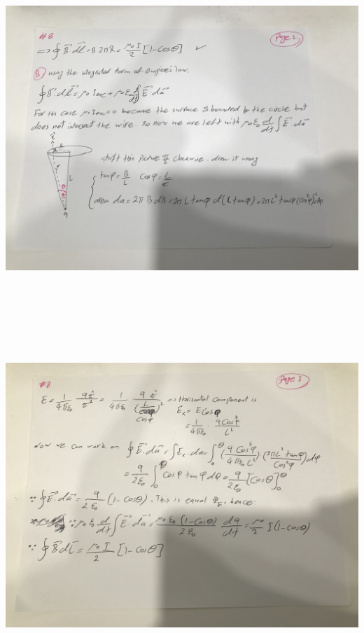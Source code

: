 \documentclass[fleqn]{article}
\begin{document}
\begin{enumerate}
    \includegraphics[height=13cm, width=15cm]{8B.jpg}

    \pagebreak

    \includegraphics[height=13cm, width=15cm]{8C.jpg}


\end{enumerate}
\end{document}
